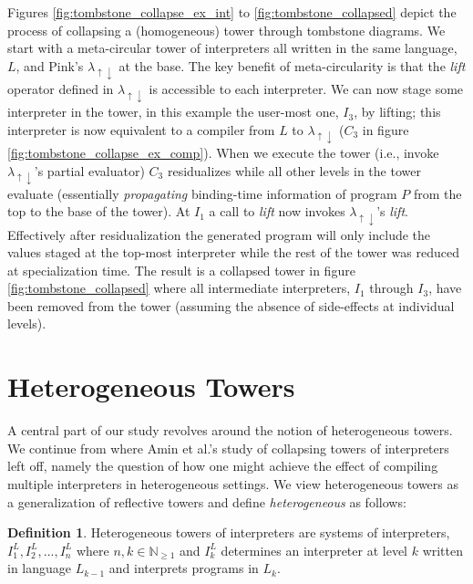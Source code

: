 \documentclass[sigplan,anonymous,review]{acmart}
\newcommand{\mslang}{$\lambda_{\uparrow\downarrow}$}
\theoremstyle{definition}
\newtheorem{definition}{Definition}[section]
\begin{document}
Figures \ref{fig:tombstone_collapse_ex_int} to \ref{fig:tombstone_collapsed} depict the process of collapsing a (homogeneous) tower through tombstone diagrams. We start with a meta-circular tower of interpreters all written in the same language, $L$, and Pink's \mslang{} at the base. The key benefit of meta-circularity is that the \textit{lift} operator defined in \mslang{} is accessible to each interpreter. We can now stage some interpreter in the tower, in this example the user-most one, $I_3$, by lifting; this interpreter is now equivalent to a compiler from $L$ to \mslang{} ($C_3$ in figure \ref{fig:tombstone_collapse_ex_comp}). When we execute the tower (i.e., invoke \mslang's partial evaluator) $C_3$ residualizes while all other levels in the tower evaluate (essentially \textit{propagating} binding-time information of program $P$ from the top to the base of the tower). At $I_1$ a call to \textit{lift} now invokes \mslang's \textit{lift}. Effectively after residualization the generated program will only include the values staged at the top-most interpreter while the rest of the tower was reduced at specialization time. The result is a collapsed tower in figure \ref{fig:tombstone_collapsed} where all intermediate interpreters, $I_1$ through $I_3$, have been removed from the tower (assuming the absence of side-effects at individual levels).

\section{Heterogeneous Towers}\label{sec:heterogeneity}
A central part of our study revolves around the notion of heterogeneous towers. We continue from where Amin et al.'s study of collapsing towers of interpreters~\cite{amin2017collapsing} left off, namely the question of how one might achieve the effect of compiling multiple interpreters in heterogeneous settings. We view heterogeneous towers as a generalization of reflective towers and define \textit{heterogeneous} as follows:

\theoremstyle{definition}
\begin{definition}
	Heterogeneous towers of interpreters are systems of interpreters, $I^L_1, I^L_2, ..., I^L_n$ where $n,k \in \mathbb N_{\ge 1}$ and $I^L_k$ determines an interpreter at level $k$ written in language $L_{k-1}$ and interprets programs in $L_k$.
\end{definition}
\end{document}
